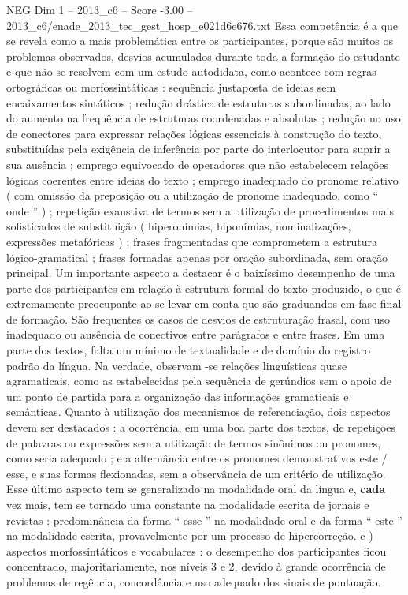 \begin{textsample}{NEG Dim 1 – 2013\_c6 – Score -3.00 – 2013\_c6/enade\_2013\_tec\_gest\_hosp\_e021d6e676.txt}
Essa competência é a que se revela como a mais problemática entre os participantes, porque são muitos os problemas observados, desvios acumulados durante toda a formação do estudante e que não se resolvem com um estudo autodidata, como acontece com regras ortográficas ou morfossintáticas : sequência justaposta de ideias sem encaixamentos sintáticos ; redução drástica de estruturas subordinadas, ao lado do aumento na frequência de estruturas coordenadas e absolutas ; redução no uso de conectores para expressar relações lógicas essenciais à construção do texto, substituídas pela exigência de inferência por parte do interlocutor para suprir a sua ausência ; emprego equivocado de operadores que não estabelecem relações lógicas coerentes entre ideias do texto ; emprego inadequado do pronome relativo ( com omissão da preposição ou a utilização de pronome inadequado, como “ onde ” ) ; repetição exaustiva de termos sem a utilização de procedimentos mais sofisticados de substituição ( hiperonímias, hiponímias, nominalizações, expressões metafóricas ) ; frases fragmentadas que comprometem a estrutura lógico-gramatical ; frases formadas apenas por oração subordinada, sem oração principal.
Um importante aspecto a destacar é o baixíssimo desempenho de uma parte dos participantes em relação à estrutura formal do texto produzido, o que é extremamente preocupante ao se levar em conta que são graduandos em fase final de formação.
São frequentes os casos de desvios de estruturação frasal, com uso inadequado ou ausência de conectivos entre parágrafos e entre frases.
Em uma parte dos textos, falta um mínimo de textualidade e de domínio do registro padrão da língua.
Na verdade, observam -se relações linguísticas quase agramaticais, como as estabelecidas pela sequência de gerúndios sem o apoio de um ponto de partida para a organização das informações gramaticais e semânticas.
Quanto à utilização dos mecanismos de referenciação, dois aspectos devem ser destacados : a ocorrência, em uma boa parte dos textos, de repetições de palavras ou expressões sem a utilização de termos sinônimos ou pronomes, como seria adequado ; e a alternância entre os pronomes demonstrativos este / esse, e suas formas flexionadas, sem a observância de um critério de utilização.
Esse último aspecto tem se generalizado na modalidade oral da língua e, \textbf{cada} vez mais, tem se tornado uma constante na modalidade escrita de jornais e revistas : predominância da forma “ esse ” na modalidade oral e da forma “ este ” na modalidade escrita, provavelmente por um processo de hipercorreção. c ) aspectos morfossintáticos e vocabulares : o desempenho dos participantes ficou concentrado, majoritariamente, nos níveis 3 e 2, devido à grande ocorrência de problemas de regência, concordância e uso adequado dos sinais de pontuação.

\end{textsample}
